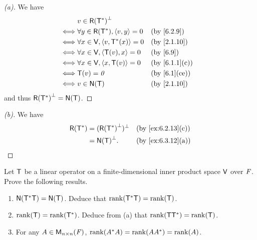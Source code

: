 \begin{proof}[(a)]
	We have
	\begin{align*}
		     & v \in \rg{\T^*}^{\perp}                                    \\
		\iff & \forall y \in \rg{\T^*}, \inn{v, y} = 0 &  & \by{6.2.9}    \\
		\iff & \forall x \in \V, \inn{v, \T^*(x)} = 0  &  & \by{2.1.10}   \\
		\iff & \forall x \in \V, \inn{\T(v), x} = 0    &  & \by{6.9}      \\
		\iff & \forall x \in \V, \inn{x, \T(v)} = 0    &  & \by{6.1.1}[c] \\
		\iff & \T(v) = \zv                             &  & \by{6.1}[ce]  \\
		\iff & v \in \ns{\T}                           &  & \by{2.1.10}
	\end{align*}
	and thus \(\rg{\T^*}^{\perp} = \ns{\T}\).
\end{proof}

\begin{proof}[(b)]
	We have
	\begin{align*}
		\rg{\T^*} & = (\rg{\T^*}^{\perp})^{\perp} &  & \by{ex:6.2.13}[c] \\
		          & = \ns{\T}^{\perp}.            &  & \by{ex:6.3.12}[a]
	\end{align*}
\end{proof}

\begin{ex}\label{ex:6.3.13}
	Let \(\mathsf{T}\) be a linear operator on a finite-dimensional inner product space \(\mathsf{V}\) over \(\mathit{F}\).
	Prove the following results.
	\begin{enumerate}
		\item \(\ns{\T^* \T} = \ns{\T}\).
		      Deduce that \(\rk{\T^* \T} = \rk{\T}\).
		\item \(\rk{\T} = \rk{\T^*}\).
		      Deduce from (a) that \(\rk{\T \T^*} = \rk{\T}\).
		\item For any \(A \in \ms[n][n][\F]\), \(\rk{A^* A} = \rk{A A^*} = \rk{A}\).
	\end{enumerate}
\end{ex}

